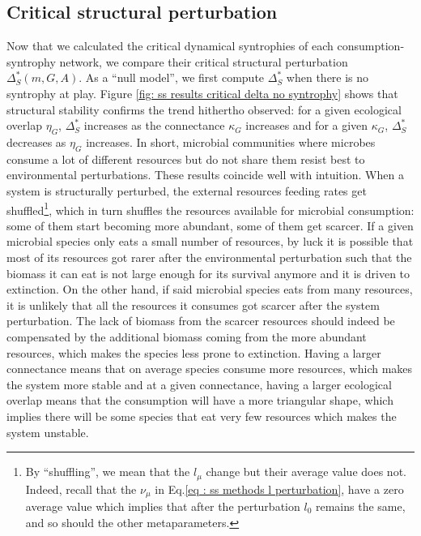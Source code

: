 \documentclass[12pt, titlepage]{report}
\begin{document}

\subsection{Critical structural perturbation}
Now that we calculated the critical dynamical syntrophies of each consumption-syntrophy network, we compare their critical structural perturbation $\Delta_S^*(m, G, A)$. As a ``null model'', we first compute $\Delta_S^*$ when there is no syntrophy at play. Figure \ref{fig: ss results critical delta no syntrophy} shows that structural stability confirms the trend hithertho observed: for a given ecological overlap $\eta_G$, $\Delta_S^*$ increases as the connectance $\kappa_G$ increases and for a given $\kappa_G$, $\Delta_S^*$ decreases as $\eta_G$ increases. In short, microbial communities where microbes consume a lot of different resources but do not share them resist best to environmental perturbations. These results coincide well with intuition.
When a system is structurally perturbed, the external resources feeding rates get shuffled\footnote{By ``shuffling'', we mean that the $l_\mu$ change but their average value does not. Indeed, recall that the $\nu_\mu$ in Eq.\eqref{eq : ss methods l perturbation}, have a zero average value which implies that after the perturbation $l_0$ remains the same, and so should the other metaparameters.}, which in turn shuffles the resources available for microbial consumption: some of them start becoming more abundant, some of them get scarcer. If a given microbial species only eats a small number of resources, by luck it is possible that most of its resources got rarer after the environmental perturbation such that the biomass it can eat is not large enough for its survival anymore and it is driven to extinction. On the other hand, if said microbial species eats from many resources, it is unlikely that all the resources it consumes got scarcer after the system perturbation. The lack of biomass from the scarcer resources should indeed be compensated by the additional biomass coming from the more abundant resources, which makes the species less prone to extinction. Having a larger connectance means that on average species consume more resources, which makes the system more stable and at a given connectance, having a larger ecological overlap means that the consumption will have a more triangular shape, which implies there will be some species that eat very few resources which makes the system unstable.
\end{document}
